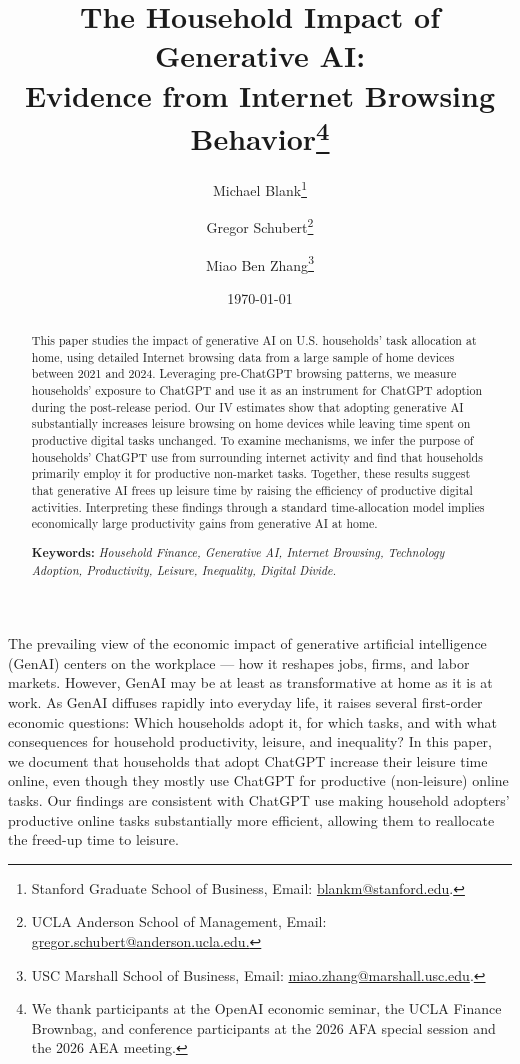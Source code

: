 \documentclass[12pt]{article}
\author{Michael Blank\thanks{
Stanford Graduate School of Business, Email: \href{mailto:blankm@stanford.edu}%
{blankm@stanford.edu}.}  \hspace{-.3cm} \and Gregor Schubert\thanks{%
UCLA Anderson School of Management, Email: \href{mailto:gregor.schubert@anderson.ucla.edu}{gregor.schubert@anderson.ucla.edu.}}  
\hspace{-.3cm}  \and Miao Ben Zhang\thanks{USC Marshall School of Business, Email: \href{mailto:Miao.Zhang@marshall.usc.edu}{%
miao.zhang@marshall.usc.edu}.}}
\title{\bf The  Household Impact of Generative AI: \\ Evidence from Internet Browsing Behavior\thanks{We thank participants at the OpenAI economic seminar, the UCLA Finance Brownbag, and conference participants at the 2026 AFA special session and the 2026 AEA meeting.}}
\date{  \today  } %
\begin{document}
\begin{titlepage}
\maketitle
\thispagestyle{empty}
\begin{abstract}

 



\onehalfspacing
\noindent This paper studies the impact of generative AI on U.S. households' task allocation at home, using detailed Internet browsing data from a large sample of home devices between 2021 and 2024. Leveraging pre-ChatGPT browsing patterns, we measure households' exposure to ChatGPT and use it as an instrument for ChatGPT adoption during the post-release period. Our IV estimates show that adopting generative AI substantially increases leisure browsing on home devices while leaving time spent on productive digital tasks unchanged. To examine mechanisms, we infer the purpose of households' ChatGPT use from surrounding internet activity and find that households primarily employ it for productive non-market tasks. Together, these results suggest that generative AI frees up leisure time by raising the efficiency of productive digital activities. Interpreting these findings through a standard time-allocation model implies economically large productivity gains from generative AI at home.
\vspace{2cm}

\noindent \textbf{Keywords:} \textit{Household Finance, Generative AI, Internet Browsing, Technology Adoption, Productivity, Leisure, Inequality, Digital Divide.}
\end{abstract}
\end{titlepage}


\doublespacing

\newpage 
\noindent 
The prevailing view of the economic impact of generative artificial intelligence (GenAI) centers on the workplace — how it reshapes jobs, firms, and labor markets. However, GenAI may be at least as transformative at home as it is at work.  As GenAI diffuses rapidly into everyday life, it raises several first-order economic questions: Which households adopt it, for which tasks, and with what consequences for household productivity, leisure, and inequality? In this paper, we document that households that adopt ChatGPT increase their leisure time online, even though they mostly use ChatGPT for productive (non-leisure) online tasks. Our findings are consistent with ChatGPT use making household adopters' productive online tasks substantially more efficient, allowing them to reallocate the freed-up time to leisure.
\end{document}
